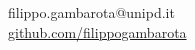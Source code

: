 \begin{frame}[plain]
\begin{center}
  \faEnvelope \hspace{0.2cm} filippo.gambarota@unipd.it\\
  \vspace{0.5cm}
  \faGithub \hspace{0.2cm} \href{github.com/filippogambarota}{github.com/filippogambarota}
\end{center}
\end{frame}
